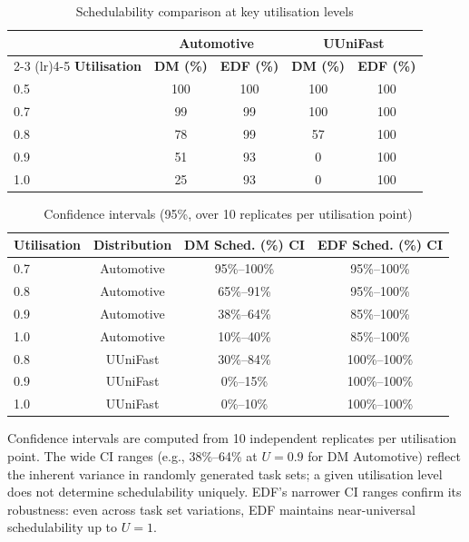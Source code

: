 \documentclass[12pt,a4paper]{article}
\begin{document}
\begin{table}[H]
\centering
\caption{Schedulability comparison at key utilisation levels}
\label{tab:sched_comparison}
\begin{tabular}{@{}lcccc@{}}
\toprule
& \multicolumn{2}{c}{\textbf{Automotive}} & \multicolumn{2}{c}{\textbf{UUniFast}} \\
\cmidrule(lr){2-3} \cmidrule(lr){4-5}
\textbf{Utilisation} & \textbf{DM (\%)} & \textbf{EDF (\%)} & \textbf{DM (\%)} & \textbf{EDF (\%)} \\
\midrule
0.5 & 100 & 100 & 100 & 100 \\
0.7 & 99  & 99  & 100 & 100 \\
0.8 & 78  & 99  & 57  & 100 \\
0.9 & 51  & 93  & 0   & 100 \\
1.0 & 25  & 93  & 0   & 100 \\
\bottomrule
\end{tabular}
\end{table}

\begin{table}[H]
\centering
\caption{Confidence intervals (95\%, over 10 replicates per utilisation point)}
\label{tab:confidence}
\begin{tabular}{@{}lccc@{}}
\toprule
\textbf{Utilisation} & \textbf{Distribution} & \textbf{DM Sched. (\%) CI} & \textbf{EDF Sched. (\%) CI} \\
\midrule
0.7 & Automotive & 95\%--100\% & 95\%--100\% \\
0.8 & Automotive & 65\%--91\% & 95\%--100\% \\
0.9 & Automotive & 38\%--64\% & 85\%--100\% \\
1.0 & Automotive & 10\%--40\% & 85\%--100\% \\
\midrule
0.8 & UUniFast & 30\%--84\% & 100\%--100\% \\
0.9 & UUniFast & 0\%--15\% & 100\%--100\% \\
1.0 & UUniFast & 0\%--10\% & 100\%--100\% \\
\bottomrule
\end{tabular}
\end{table}
Confidence intervals are computed from 10 independent replicates per utilisation point. The wide CI ranges (e.g., 38\%--64\% at \(U=0.9\) for DM Automotive) reflect the inherent variance in randomly generated task sets; a given utilisation level does not determine schedulability uniquely. EDF's narrower CI ranges confirm its robustness: even across task set variations, EDF maintains near-universal schedulability up to \(U=1\).
\end{document}
